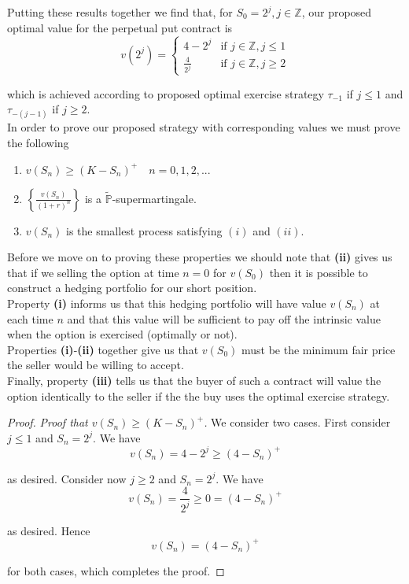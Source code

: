 \documentclass[12pt]{article}
\newlength\tindent
\renewcommand{\indent}{\hspace*{\tindent}}
\newcommand{\Z}{\mathbb Z}
\renewcommand{\P}{\mathbb P}
\begin{document}
\indent Putting these results together we find that, for $S_0 = 2^j, j \in \Z$, our proposed optimal value for the perpetual put contract is
\begin{equation*}
	v(2^j) =
	\begin{cases}
		4 - 2^j & \text{if } j \in \Z, j \leq 1 \\
		\frac{4}{2^j} & \text{if } j \in \Z, j \geq 2
	\end{cases}
\end{equation*}

which is achieved according to proposed optimal exercise strategy $\tau_{-1}$ if $j \leq 1$ and $\tau_{-(j - 1)}$ if $j \geq 2$. \\

\indent In order to prove our proposed strategy with corresponding values we must prove the following
\begin{enumerate}[\bf (i)]
	\item $v(S_n) \geq (K - S_n)^+ \quad n = 0,1,2,...$
	\item $\left\{ \frac{v(S_n)}{(1 + r)^n} \right\} $ is a $\tilde{\P}$-supermartingale. 
	\item $v(S_n)$ is the smallest process satisfying $(i)$ and $(ii)$.
\end{enumerate}

\indent Before we move on to proving these properties we should note that {\bf (ii)} gives us that if we selling the option at time $n = 0$ for $v(S_0)$ then it is possible to construct a hedging portfolio for our short position. \\

\indent Property {\bf (i)} informs us that this hedging portfolio will have value $v(S_n)$ at each time $n$ and that this value will be sufficient to pay off the intrinsic value when the option is exercised (optimally or not). \\

\indent Properties {\bf (i)}-{\bf (ii)} together give us that $v(S_0)$ must be the minimum fair price the seller would be willing to accept. \\

\indent Finally, property {\bf (iii)} tells us that the buyer of such a contract will value the option identically to the seller if the the buy uses the optimal exercise strategy.

\begin{proof} {\em Proof that $v(S_n) \geq (K - S_n)^+$.} We consider two cases. First consider $j \leq 1$ and $S_n = 2^j$. We have
\begin{equation*}
	v(S_n) = 4 - 2^j \geq (4 - S_n)^+
\end{equation*}

as desired. Consider now $j \geq 2$ and $S_n = 2^j$. We have
\begin{equation*}
	v(S_n) = \frac{4}{2^j} \geq 0 = (4 - S_n)^+
\end{equation*}

as desired. Hence
\begin{equation*}
	v(S_n) = (4 - S_n)^+ 
\end{equation*}

for both cases, which completes the proof.
\end{proof}
\end{document}
